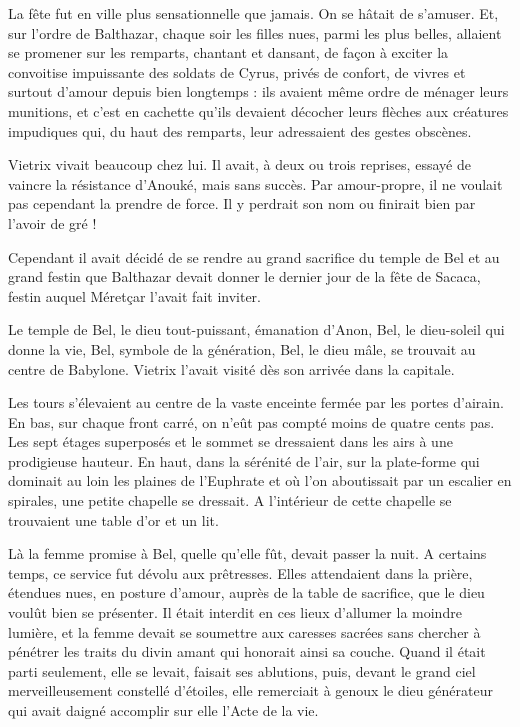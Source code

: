 \documentclass[a4paper, 11pt, oneside, polutonikogreek, french]{article}
\begin{document}
La fête fut en ville plus sensationnelle que jamais. On se hâtait de s'amuser. Et, sur l'ordre de Balthazar, chaque soir les filles nues, parmi les plus belles, allaient se promener sur les remparts, chantant et dansant, de façon à exciter la convoitise impuissante des soldats de Cyrus, privés de confort, de vivres et surtout d'amour depuis bien longtemps : ils avaient même ordre de ménager leurs munitions, et c'est en cachette qu'ils devaient décocher leurs flèches aux créatures impudiques qui, du haut des remparts, leur adressaient des gestes obscènes.

Vietrix vivait beaucoup chez lui. Il avait, à deux ou trois reprises, essayé de vaincre la résistance d'Anouké, mais sans succès. Par amour-propre, il ne voulait pas cependant la prendre de force. Il y perdrait son nom ou finirait bien par l'avoir de gré !

Cependant il avait décidé de se rendre au grand sacrifice du temple de Bel et au grand festin que Balthazar devait donner le dernier jour de la fête de Sacaca, festin auquel Méretçar l'avait fait inviter.

\bigskip
\centerline{\EightStarTaper}
\centerline{\EightStarTaper\EightStarTaper}
\bigskip

Le temple de Bel, le dieu tout-puissant, émanation d'Anon, Bel, le dieu-soleil qui donne la vie, Bel, symbole de la génération, Bel, le dieu mâle, se trouvait au centre de Babylone. Vietrix l'avait visité dès son arrivée dans la capitale.

Les tours s'élevaient au centre de la vaste enceinte fermée par les portes d'airain. En bas, sur chaque front carré, on n'eût pas compté moins de quatre cents pas. Les sept étages superposés et le sommet se dressaient dans les airs à une prodigieuse hauteur. En haut, dans la sérénité de l'air, sur la plate-forme qui dominait au loin les plaines de l'Euphrate et où l'on aboutissait par un escalier en spirales, une petite chapelle se dressait. A l'intérieur de cette chapelle se trouvaient une table d'or et un lit.

\bigskip
\centerline{\EightStarTaper}
\centerline{\EightStarTaper\EightStarTaper}
\bigskip

Là la femme promise à Bel, quelle qu'elle fût, devait passer la nuit. A certains temps, ce service fut dévolu aux prêtresses. Elles attendaient dans la prière, étendues nues, en posture d'amour, auprès de la table de sacrifice, que le dieu voulût bien se présenter. Il était interdit en ces lieux d'allumer la moindre lumière, et la femme devait se soumettre aux caresses sacrées sans chercher à pénétrer les traits du divin amant qui honorait ainsi sa couche. Quand il était parti seulement, elle se levait, faisait ses ablutions, puis, devant le grand ciel merveilleusement constellé d'étoiles, elle remerciait à genoux le dieu générateur qui avait daigné accomplir sur elle l'Acte de la vie.
\end{document}
